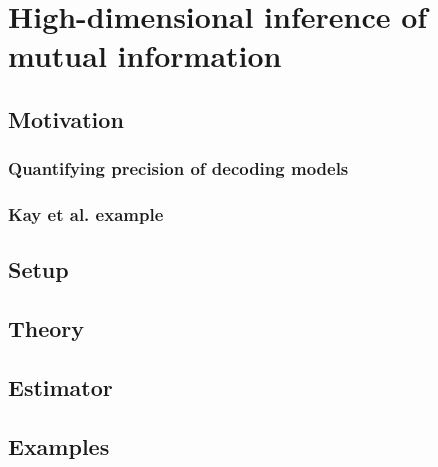
\chapter{High-dimensional inference of mutual information} %

\label{Chapter5} %

\section{Motivation}

\subsection{Quantifying precision of decoding models}

\subsection{Kay et al. example}

\section{Setup}

\section{Theory}

\section{Estimator}

\section{Examples}


